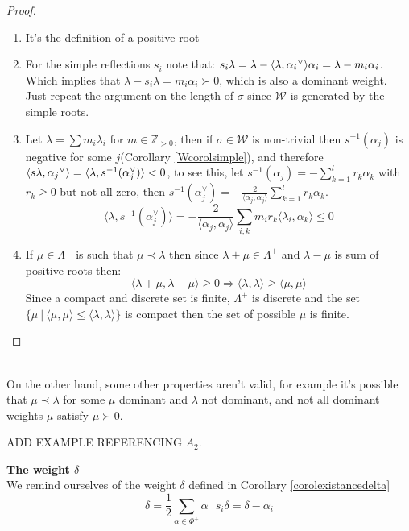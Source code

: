 \begin{proof}
	\begin{enumerate}
		\item It's the definition of a positive root
		\item For the simple reflections $s_i$ note that:
		$s_i\lambda = \lambda - \langle {\lambda},{\alpha_i}^\lor\rangle \alpha_i = \lambda - m_i \alpha_i$.\\
		Which implies that $\lambda - s_i\lambda = m_i \alpha_i \succ 0$, which is also a dominant weight.\\
		Just repeat the argument on the length of $\sigma$ since $\mathcal{W}$ is generated by the simple roots.
		\item Let $\lambda = \sum m_i \lambda_i$ for $m \in \mathbb{Z}_{>0}$, then if $\sigma \in \mathcal{W}$ is non-trivial then $s^{-1}(\alpha_j)$ is negative for some $j$(Corollary \ref{Wcorolsimple}), and therefore $\langle {s\lambda},{\alpha_j}^\lor\rangle  =\langle \lambda, s^{-1}(\alpha_j^\lor) \rangle < 0$, to see this, let $s^{-1}(\alpha_j) = -\sum_{k=1}^l r_k \alpha_k$ with $r_k \ge 0$ but not all zero, then $s^{-1}(\alpha_j^\lor) = -\frac{2}{\langle \alpha_j,\alpha_j \rangle}\sum_{k=1}^l r_k\alpha_k$.
		$$ \langle \lambda, s^{-1}(\alpha_j^\lor)\rangle =  -\frac{2}{\langle \alpha_j,\alpha_j\rangle} \sum_{i,k} m_ir_k \langle \lambda_i,\alpha_k\rangle \le 0$$
		\item If $\mu \in \Lambda^+$ is such that $\mu \prec \lambda$ then since $\lambda + \mu \in \Lambda^+$ and $\lambda - \mu$ is sum of positive roots then:
		$$\langle\lambda + \mu, \lambda - \mu \rangle \ge 0 \Rightarrow  \langle \lambda, \lambda \rangle \ge \langle \mu, \mu \rangle $$
		Since a compact and discrete set is finite, $\Lambda^+$ is discrete and the set $\{\mu \ |\  \langle \mu, \mu \rangle  \le \langle \lambda, \lambda \rangle \}$ is compact then the set of possible $\mu$ is finite.
	\end{enumerate}
\end{proof}\\
On the other hand, some other properties aren't valid, for example it's possible that $\mu \prec \lambda$ for some $\mu$ dominant and $\lambda$ not dominant, and not all dominant weights $\mu$ satisfy $\mu \succ 0$.
\begin{ex}
	ADD EXAMPLE REFERENCING $A_2$.
	\label{refweight}
\end{ex}
\textbf{The weight $\delta$}\\
We remind ourselves of the weight $\delta$ defined in Corollary \ref{corolexistancedelta}
$$ \delta = \frac{1}{2}\sum_{\alpha \in \Phi^+} \alpha \ \ \ s_i\delta = \delta-\alpha_i$$
